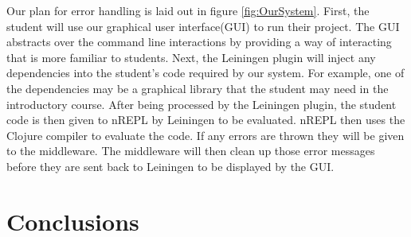 \documentclass[12pt]{article}
\newcommand{\comment}[1]{{\bf \tt  {#1}}}
\newcommand{\emcomment}[1]{\textcolor{ForestGreen}{\comment{Elena: {#1}}}}
\newcommand{\escomment}[1]{\textcolor{BlueViolet}{\comment{Emma: {#1}}}}
\begin{document}
Our plan for error handling is laid out in figure \ref{fig:OurSystem}. First, the student will use our graphical user interface(GUI) to run their project. The GUI abstracts over the command line interactions by providing a way of interacting that is more familiar to students. Next, the Leiningen plugin will inject any dependencies into the student's code required by our system. For example, one of the dependencies may be a graphical library that the student may need in the introductory course. After being processed by the Leiningen plugin, the student code is then given to nREPL by Leiningen to be evaluated. nREPL then uses the Clojure compiler to evaluate the code. If any errors are thrown they will be given to the middleware. The middleware will then clean up those error messages before they are sent back to Leiningen to be displayed by the GUI.

\section{Conclusions}\label{sec:conclusion}





\end{document}
